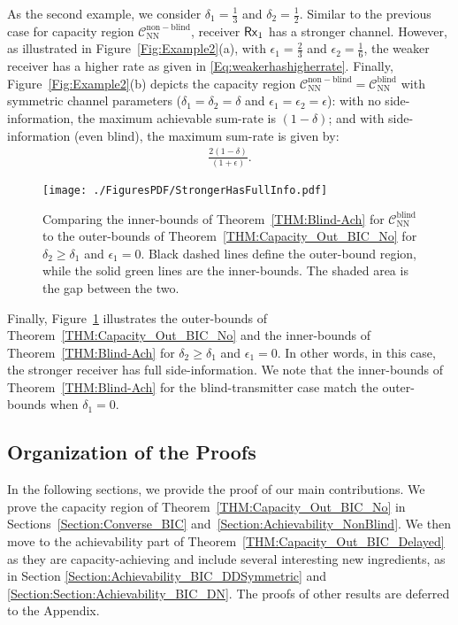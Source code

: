 \documentclass[journal,12pt,draftcls,onecolumn]{IEEEtran}
\begin{document}
As the second example, we consider $\delta_1 = \frac{1}{3}$ and $\delta_2 = \frac{1}{2}$. Similar to the previous case for capacity region $\mathcal{C}^{\mathrm{non-blind}}_{\mathrm{NN}}$, receiver ${\sf Rx}_1$ has a stronger channel. However, as illustrated in Figure~\ref{Fig:Example2}(a), with $\epsilon_1 = \frac{2}{3}$ and $\epsilon_2 = \frac{1}{6}$, the weaker receiver has a higher rate as given in \eqref{Eq:weakerhashigherrate}. Finally, Figure~\ref{Fig:Example2}(b) depicts the capacity region $\mathcal{C}^{\mathrm{non-blind}}_{\mathrm{NN}}=\mathcal{C}^{\mathrm{blind}}_{\mathrm{NN}}$ with symmetric channel parameters ($\delta_1 = \delta_2 = \delta$ and $\epsilon_1 = \epsilon_2 = \epsilon$): with no side-information, the maximum achievable sum-rate is $(1-\delta)$; and with side-information (even blind), the maximum sum-rate is given by:
\begin{align}
\frac{2(1-\delta)}{(1+\epsilon)}.
\end{align}

\begin{figure}[!ht]
\centering
\texttt{[image: ./FiguresPDF/StrongerHasFullInfo.pdf]}
\caption{Comparing the inner-bounds of Theorem~\ref{THM:Blind-Ach} for $\mathcal{C}^{\mathrm{blind}}_{\mathrm{NN}}$ to the outer-bounds of Theorem~\ref{THM:Capacity_Out_BIC_No} for $\delta_2 \geq \delta_1$ and $\epsilon_1 = 0$. Black dashed lines define the outer-bound region, while the solid green lines are the inner-bounds. The shaded area is the gap between the two.\label{Fig:StrongerwithFullSideInfo}}
\end{figure}

Finally, Figure~\ref{Fig:StrongerwithFullSideInfo} illustrates the outer-bounds of Theorem~\ref{THM:Capacity_Out_BIC_No} and the inner-bounds of Theorem~\ref{THM:Blind-Ach} for $\delta_2 \geq \delta_1$ and $\epsilon_1 = 0$. In other words, in this case, the stronger receiver has full side-information. We note that the inner-bounds of Theorem~\ref{THM:Blind-Ach} for the blind-transmitter case match the outer-bounds when $\delta_1 = 0$.

\subsection{Organization of the Proofs}

In the following sections, we provide the proof of our main contributions. We prove the capacity region of Theorem~\ref{THM:Capacity_Out_BIC_No} in Sections~\ref{Section:Converse_BIC} and~\ref{Section:Achievability_NonBlind}. We then move to the achievability part of Theorem~\ref{THM:Capacity_Out_BIC_Delayed} as they are capacity-achieving and include several interesting new ingredients, as in Section \ref{Section:Achievability_BIC_DDSymmetric} and \ref{Section:Section:Achievability_BIC_DN}. The proofs of other results are deferred to the Appendix.
\end{document}
